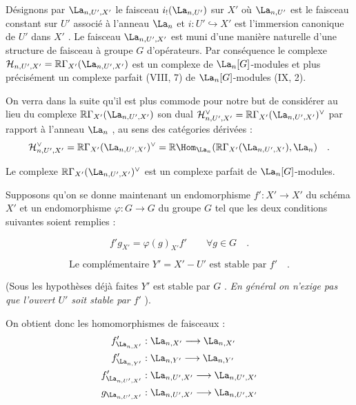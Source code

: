 Désignons par $\La_{n,U',X'}$ le faisceau $i_!(\La_{n,U'})$ sur $X'$ où $\La_{n,U'}$ est le faisceau constant sur $U'$ associé à l'anneau $\La_n$ et $i : U' \hookrightarrow X'$ est l'immersion canonique de $U'$ dans $X'$ . Le faisceau $\La_{n,U',X'}$ est muni d'une manière naturelle d'une structure de faisceau à groupe $G$ d'opérateurs. Par conséquence le complexe $\mathcal{H}_{n,U',X'} = \mathbb{R}\Gamma_{X'}(\La_{n,U',X'})$ est un complexe de $\La_n[G]$-modules
et plus précisément un complexe parfait (VIII, 7) de $\La_n[G]$-modules (IX, 2).

On verra dans la suite qu'il est plus commode pour notre but de considérer au lieu du complexe $\mathbb{R}\Gamma_{X'}(\La_{n,U',X'})$ son dual $\mathcal{H}_{n,U',X'}^\vee = \mathbb{R}\Gamma_{X'}(\La_{n,U',X'})^\vee$ par rapport à l'anneau $\La_n$ , au sens des catégories dérivées :
\[
\mathcal{H}_{n,U',X'}^\vee = \mathbb{R}\Gamma_{X'}(\La_{n,U',X'})^\vee = \mathbb{R}\Hom_{\La_n}(\mathbb{R}\Gamma_{X'}(\La_{n,U',X'}), \La_n) \quad .
\]

Le complexe $\mathbb{R}\Gamma_{X'}(\La_{n,U',X'})^\vee$ est un complexe parfait de $\La_n[G]$-modules.

Supposons qu'on se donne maintenant un endomorphisme $f' : X' \to X'$ du schéma $X'$ et un endomorphisme $\varphi : G \to G$ du groupe $G$ tel que les deux conditions suivantes soient remplies :

\begin{equation}\tag{1.1}
f' g_{X'} = \varphi(g)_{X'} f' \qquad \forall g \in G \quad .
\end{equation}

\begin{equation}\tag{1.2}
\text{Le complémentaire } Y' = X' - U' \text{ est stable par } f' \quad .
\end{equation}

(Sous les hypothèses déjà faites $Y'$ est stable par $G$ . \emph{En général on n'exige pas que l'ouvert $U'$ soit stable par $f'$} ).

On obtient donc les homomorphismes de faisceaux :
\begin{align*}
f'_{\La_{n,X'}} &: \La_{n,X'} \longrightarrow \La_{n,X'} \\
f'_{\La_{n,Y'}} &: \La_{n,Y'} \longrightarrow \La_{n,Y'} \\
f'_{\La_{n,U',X'}} &: \La_{n,U',X'} \longrightarrow \La_{n,U',X'} \\
g_{\La_{n,U',X'}} &: \La_{n,U',X'} \longrightarrow \La_{n,U',X'}
\end{align*}


